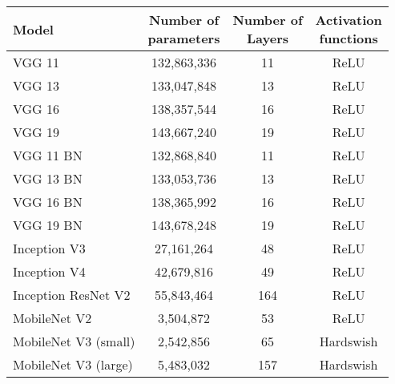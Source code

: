 \begin{table}[h]
{\begin{tabular}{l|ccc}
\textbf{Model}       & \makecell{\textbf{Number of}\\ \textbf{parameters}} & \makecell{\textbf{Number of}\\ \textbf{Layers}} & \makecell{\textbf{Activation}\\ \textbf{functions}} \\ 
\midrule
VGG 11               & 132,863,336                   & 11                        & ReLU                          \\
VGG 13               & 133,047,848                   & 13                        & ReLU                          \\
VGG 16               & 138,357,544                   & 16                        & ReLU                          \\
VGG 19               & 143,667,240                   & 19                        & ReLU                          \\ \midrule
VGG 11 BN            & 132,868,840                   & 11                        & ReLU                          \\
VGG 13 BN            & 133,053,736                   & 13                        & ReLU                          \\
VGG 16 BN            & 138,365,992                   & 16                        & ReLU                          \\
VGG 19 BN            & 143,678,248                   & 19                        & ReLU                          \\ \midrule
Inception V3         & 27,161,264                    & 48                        & ReLU                          \\
Inception V4         & 42,679,816                    & 49                        & ReLU                          \\
Inception ResNet V2  & 55,843,464                    & 164                       & ReLU                          \\ \midrule
MobileNet V2         & 3,504,872                     & 53                        & ReLU                          \\
MobileNet V3 (small) & 2,542,856                     & 65                      & Hardswish                     \\
MobileNet V3 (large) & 5,483,032                     & 157                      & Hardswish                     \\ \bottomrule

\end{tabular}}
\end{table}

